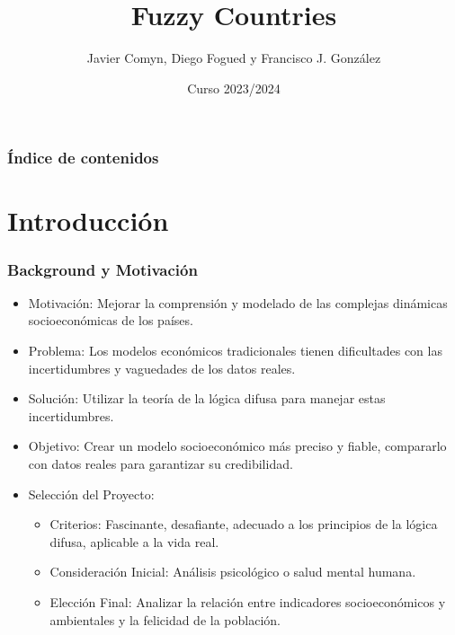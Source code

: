 \documentclass{beamer}
\title{Fuzzy Countries}
\author{Javier Comyn, Diego Fogued y Francisco J. González}
\institute{Universidad Politécnica de Madrid}
\date{Curso 2023/2024}
\begin{document}
\frame{\titlepage}

\begin{frame}
\frametitle{Índice de contenidos}
\tableofcontents
\end{frame}

\section{Introducción}
\begin{frame}
\frametitle{Background y Motivación}

\begin{itemize}
    \item Motivación: Mejorar la comprensión y modelado de las complejas dinámicas socioeconómicas de los países.
    \item Problema: Los modelos económicos tradicionales tienen dificultades con las incertidumbres y vaguedades de los datos reales.
    \item Solución: Utilizar la teoría de la lógica difusa para manejar estas incertidumbres.
    \item Objetivo: Crear un modelo socioeconómico más preciso y fiable, compararlo con datos reales para garantizar su credibilidad.
    \item Selección del Proyecto:
    \begin{itemize}
        \item Criterios: Fascinante, desafiante, adecuado a los principios de la lógica difusa, aplicable a la vida real.
        \item Consideración Inicial: Análisis psicológico o salud mental humana.
        \item Elección Final: Analizar la relación entre indicadores socioeconómicos y ambientales y la felicidad de la población.
    \end{itemize}
\end{itemize}

\end{frame}
\end{document}
